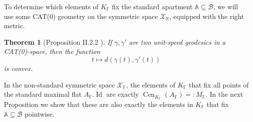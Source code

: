 \documentclass[12pt]{amsart}
\newcommand{\F}{\mathbb{F} }
\newcommand{\R}{\mathbb{R} }
\newcommand{\X}{\mathcal{X}}
\newcommand{\A}{\mathbb{A}}
\newcommand{\B}{\mathcal{B}}
\numberwithin{equation}{section}
\newtheorem{theorem}{Theorem}[section]
\theoremstyle{remark} %
\begin{document}
To determine which elements of $K_\F$ fix the standard apartment $\A \subseteq \B$, we will use some CAT(0) geometry on the symmetric space $\X_\R$, equipped with the right metric. %

\begin{theorem}[Proposition II.2.2 \cite{BH99}]\label{thm:CAT0_convex}
	If $\gamma, \gamma'$ are two unit-speed geodesics in a CAT(0)-space, then the function 
	$$t \mapsto d(\gamma(t),\gamma'(t))$$ is convex.
\end{theorem}

In the non-standard symmetric space $\X_\F$, the elements of $K_\F$ that fix all points of the standard maximal flat $A_\F.\operatorname{Id}$ are exactly $\operatorname{Cen}_{K_\F}(A_\F) =: M_\F$. In the next Proposition we show that these are also exactly the elements in $K_\F$ that fix $\A \subseteq \B$ pointwise.
\end{document}
